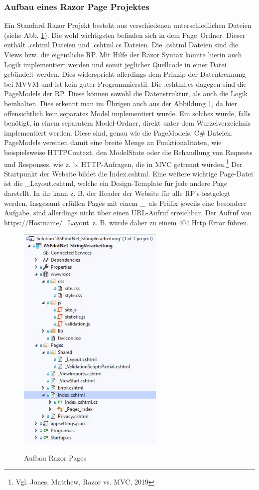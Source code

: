 \documentclass[a4paper,
12pt,
oneside]
{article}
\begin{document}
	\subsubsection{Aufbau eines Razor Page Projektes}
	Ein Standard Razor Projekt besteht aus verschiedenen unterschiedlichen Dateien (siehe Abb. \ref{fig:aufbau}). Die wohl wichtigsten befinden sich in dem \glqq Page\grqq~Ordner. Dieser enthält .cshtml Dateien und .cshtml.cs Dateien. Die .cshtml Dateien sind die Views bzw. die eigentliche RP. Mit Hilfe der Razor Syntax könnte hierin auch Logik implementiert werden und somit jeglicher Quellcode in einer Datei gebündelt werden. Dies widerspricht allerdings dem Prinzip der Datentrennung bei MVVM und ist kein guter Programmierstil. Die .cshtml.cs dagegen sind die PageModels der RP. Diese können sowohl die Datenstruktur, als auch die Logik beinhalten. Dies erkennt man im Übrigen auch aus der Abbildung \ref{fig:aufbau}, da hier offensichtlich kein separates Model implementiert wurde. Ein solches würde, falls benötigt, in einem separatem Model-Ordner, direkt unter dem Wurzelverzeichnis implementiert werden. Diese sind, genau wie die PageModels, C\# Dateien. PageModels vereinen damit eine breite Menge an Funktionalitäten, wie beispielsweise HTTPContext, den ModelState oder die Behandlung von Requests und Responses, wie z. b. HTTP-Anfragen, die in MVC getrennt würden.\footnote{Vgl. Jones, Matthew, Razor vs. MVC, 2019} Der Startpunkt der Website bildet die Index.cshtml. Eine weitere wichtige Page-Datei ist die \_Layout.cshtml, welche ein Design-Template für jede andere Page darstellt. In ihr kann z. B. der Header der Website für alle RP's festgelegt werden. Insgesamt erfüllen Pages mit einem \glqq\_\grqq~als Präfix jeweils eine besondere Aufgabe, sind allerdings nicht über einen URL-Aufruf erreichbar. Der Aufruf von \glqq https://Hostname/\_Layout\grqq~z. B. würde daher zu einem 404 Http Error führen.
	\begin{figure}
		\centering
		\caption{Aufbau Razor Pages} 
		\includegraphics[width=7cm]{img/aufbau.jpg} \\
		\label{fig:aufbau}
	\end{figure}
\end{document}
